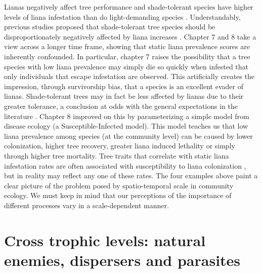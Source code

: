\documentclass[b5paper,justified]{tufte-book} %
\begin{document}
\begin{fullwidth}
Lianas negatively affect tree performance \citep{Ingwell2010} and shade-tolerant species have higher levels of liana infestation than do light-demanding species \citep[e.g.][]{Clark1990}. Understandably, previous studies proposed that shade-tolerant tree species should be disproportionately negatively affected by liana increases \citep{Schnitzer2002}. Chapter 7 and 8 take a view across a longer time frame, showing that static liana prevalence scores are inherently confounded. In particular, chapter 7 raises the possibility that a tree species with low liana prevalence may simply die so quickly when infested that only individuals that escape infestation are observed. This artificially creates the impression, through survivorship bias, that a species is an excellent evader of lianas. Shade-tolerant trees may in fact be less affected by lianas due to their greater tolerance, a conclusion at odds with the general expectations in the literature \citep{Putz1984a, Clark1990, Schnitzer2000, Heijden2008, Schnitzer2010}. Chapter 8 improved on this by parameterizing a simple model from disease ecology (a Susceptible-Infected model). This model teaches us that low liana prevalence among species (at the community level) can be caused by lower colonization, higher tree recovery, greater liana induced lethality or simply through higher tree mortality. Tree traits that correlate with static liana infestation rates are often associated with susceptibility to liana colonization \citep[e.g.][]{Heijden2008}, but in reality may reflect any one of these rates. The four examples above paint a clear picture of the problem posed by spatio-temporal scale in community ecology. We must keep in mind that our perceptions of the importance of different processes vary in a scale-dependent manner.

\section{Cross trophic levels: natural enemies, dispersers and parasites}


\end{fullwidth}
\end{document}

